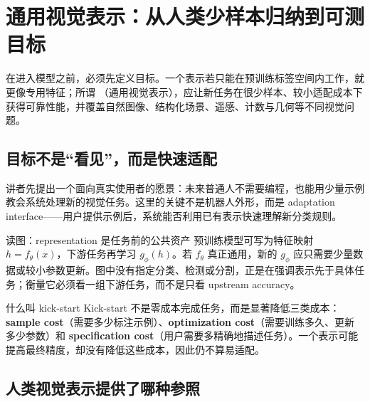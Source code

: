 \section{通用视觉表示：从人类少样本归纳到可测目标}

在进入模型之前，必须先定义目标。一个表示若只能在预训练标签空间内工作，就更像专用特征；所谓 （通用视觉表示），应让新任务在很少样本、较小适配成本下获得可靠性能，并覆盖自然图像、结构化场景、遥感、计数与几何等不同视觉问题。

\subsection{目标不是“看见”，而是快速适配}

讲者先提出一个面向真实使用者的愿景：未来普通人不需要编程，也能用少量示例教会系统处理新的视觉任务。这里的关键不是机器人外形，而是 adaptation interface——用户提供示例后，系统能否利用已有表示快速理解新分类规则。


\begin{knowledgebox}{读图：representation 是任务前的公共资产}
预训练模型可写为特征映射 $h=f_{\theta}(x)$，下游任务再学习 $g_{\phi}(h)$。若 $f_{\theta}$ 真正通用，新的 $g_{\phi}$ 应只需要少量数据或较小参数更新。图中没有指定分类、检测或分割，正是在强调表示先于具体任务；衡量它必须看一组下游任务，而不是只看 upstream accuracy。
\end{knowledgebox}


\begin{importantbox}{什么叫 kick-start}
Kick-start 不是零成本完成任务，而是显著降低三类成本：\textbf{sample cost}（需要多少标注示例）、\textbf{optimization cost}（需要训练多久、更新多少参数）和 \textbf{specification cost}（用户需要多精确地描述任务）。一个表示可能提高最终精度，却没有降低这些成本，因此仍不算易适配。
\end{importantbox}


\subsection{人类视觉表示提供了哪种参照}

